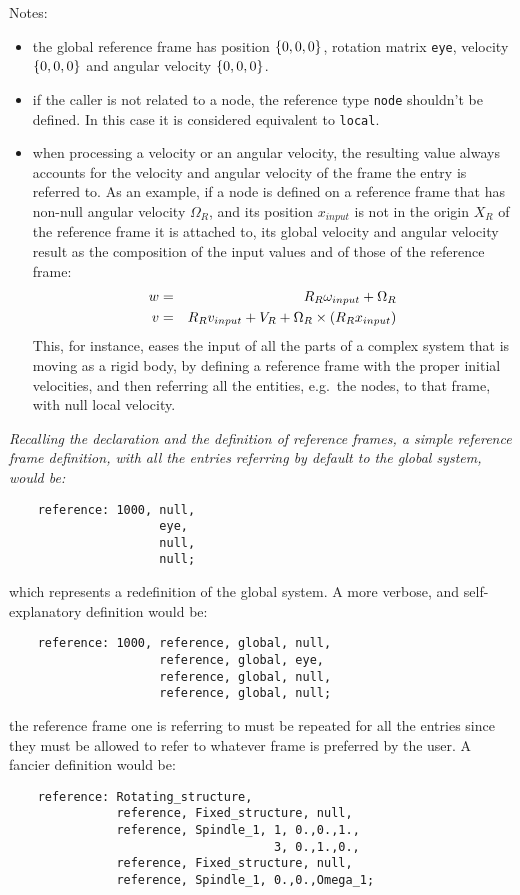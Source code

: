 Notes: 
\begin{itemize}
    \item the global reference frame has position $ \left\{ 0, 0, 0 \right\} $,
    rotation matrix \texttt{eye}, velocity $ \left\{ 0, 0, 0 \right\} $ and angular
    velocity $ \left\{ 0, 0, 0 \right\} $.
    \item if the caller is not related to a node, the reference type
    \texttt{node} shouldn't be defined. 
    In this case it is considered equivalent to \texttt{local}.
    \item when processing a velocity or an angular velocity, the resulting
    value always accounts for the velocity and angular velocity of the frame
    the entry is referred to. 
    As an example, if a node is defined on a reference frame that has
    non-null angular velocity $ \Omega_R $, and its position 
    $ x_{input} $ is not in the origin $ X_R $ of the reference frame
    it is attached to, its global velocity and angular velocity result
    as the composition of the input values and of those of the reference 
    frame:
    \begin{eqnarray*}    
        w & = & R_R\omega_{input}+\Omega_R \\
	v & = & R_Rv_{input}+V_R+\Omega_R\times\left( R_Rx_{input} \right)
    \end{eqnarray*}
    This, for instance, eases the input of all the parts of a complex system
    that is moving as a rigid body, by defining a reference frame with the
    proper initial velocities, and then referring all the entities, e.g.\ the 
    nodes, to that frame, with null local velocity.
\end{itemize}  
{\em
    Recalling the declaration and the definition of reference frames,
    a simple reference frame definition, with all the entries referring 
    by default to the global system, would be:
    \begin{verbatim}
    reference: 1000, null,
                     eye,
                     null,
                     null;			 
    \end{verbatim}
    which represents a redefinition of the global system.
    A more verbose, and self-explanatory definition would be:
    \begin{verbatim}
    reference: 1000, reference, global, null,
                     reference, global, eye,
                     reference, global, null,
                     reference, global, null;			 
    \end{verbatim}
    the reference frame one is referring to must be repeated for all the entries
    since they must be allowed to refer to whatever frame is preferred 
    by the user.
    A fancier definition would be:
    \begin{verbatim}
    reference: Rotating_structure, 
               reference, Fixed_structure, null,
               reference, Spindle_1, 1, 0.,0.,1., 
                                     3, 0.,1.,0.,
               reference, Fixed_structure, null,
               reference, Spindle_1, 0.,0.,Omega_1;
    \end{verbatim}
}


